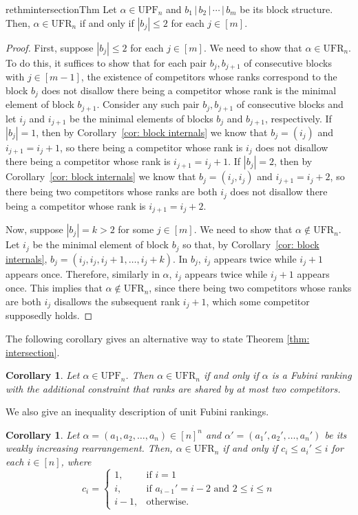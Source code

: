 \documentclass[11pt,reqno]{amsart}
\newcommand{\ufr}[1]{\mathrm{UFR}_{#1}}
\newcommand{\upf}[1]{\mathrm{UPF}_{#1}}
\newtheorem{corollary}[rethm]{Corollary}
\begin{document}
\begin{restatable}{rethm}{intersectionThm}
\label{thm: intersection}
Let $\alpha \in \upf{n}$ and $b_1 \,|\, b_2 \,|\, \cdots \,|\, b_m$ be its block structure.
Then, $\alpha \in \ufr{n}$ if and only if $|b_j| \leq 2$ for each $j \in [m]$.
\end{restatable}
\begin{proof}
First, suppose $|b_j| \leq 2$ for each $j \in [m]$.
We need to show that $\alpha \in \ufr{n}$.
To do this, it suffices to show that for each pair $b_j, b_{j+1}$ of consecutive blocks with $j \in [m-1]$, the existence of competitors whose ranks correspond to the block $b_j$ does not disallow there being a competitor whose rank is the minimal element of block $b_{j+1}$.
Consider any such pair $b_j, b_{j+1}$ of consecutive blocks and let $i_j$ and $i_{j+1}$ be the minimal elements of blocks $b_j$ and $b_{j+1}$, respectively.
If $|b_j| = 1$, then by Corollary~\ref{cor: block internals} we know that $b_j = (i_j)$ and $i_{j+1} = i_j + 1$, so there being a competitor whose rank is $i_j$ does not disallow there being a competitor whose rank is $i_{j+1} = i_j + 1$.
If $|b_j| = 2$, then by Corollary~\ref{cor: block internals} we know that $b_j = (i_j, i_j)$ and $i_{j+1} = i_j + 2$, so there being two competitors whose ranks are both $i_j$ does not disallow there being a competitor whose rank is $i_{j+1} = i_j + 2$.



Now, suppose $|b_j| = k > 2$ for some $j \in [m]$.
We need to show that $\alpha \notin \ufr{n}$.
Let $i_j$ be the minimal element of block $b_j$ so that, by Corollary~\ref{cor: block internals}, $b_j = (i_j, i_j, i_j + 1, \ldots, i_j + k)$.
In $b_j$, $i_j$ appears twice while $i_j + 1$ appears once.
Therefore, similarly in $\alpha$, $i_j$ appears twice while $i_j + 1$ appears once.
This implies that $\alpha \notin \ufr{n}$, since there being two competitors whose ranks are both $i_j$ disallows the subsequent rank $i_j + 1$, which some competitor supposedly holds.
\end{proof}
The following corollary gives an alternative way to state Theorem \ref{thm: intersection}.
\begin{corollary}
\label{lemma: ufr intersection}
Let $\alpha\in\upf{n}$. Then $\alpha\in\ufr{n}$ if and only if $\alpha$ is a Fubini ranking with the additional constraint that ranks are shared by at most two competitors. 
\end{corollary}
We also give an inequality description of unit Fubini rankings.
\begin{corollary}
\label{cor: characterization}
Let $\alpha=(a_1,a_2,\ldots,a_n)\in[n]^n$ and $\alpha'=(a_1',a_2',\ldots,a_n')$ be its weakly increasing rearrangement.
Then, $\alpha \in \ufr{n}$ if and only if $c_i\leq a_i'\leq i$ for each $i\in[n]$, where 
\[c_i=\begin{cases}
1,&\mbox{if $i=1$}\\
i,&\mbox{if $a_{i-1}'=i-2$ and $2\leq i\leq n$}\\
i-1,&\mbox{otherwise}.
\end{cases}\]
\end{corollary}
\end{document}
